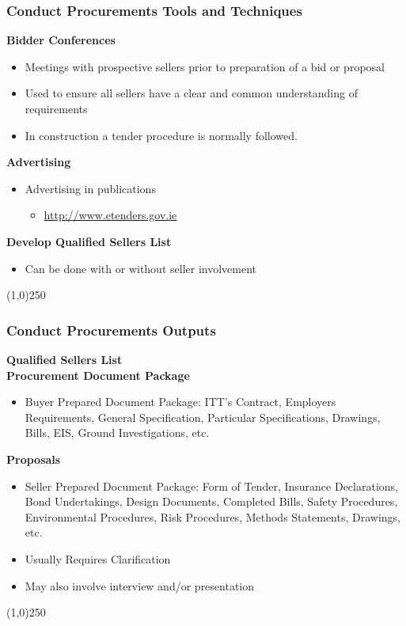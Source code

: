 \begin{frame}
\frametitle{Conduct Procurements \hfill\hfill Tools and Techniques}
\textbf{Bidder Conferences}
	\begin{itemize}
		\item Meetings with prospective sellers prior to preparation of a bid or proposal
		\item Used to ensure all sellers have a clear and common understanding of requirements
		\item In construction a tender procedure is normally followed.
	\end{itemize}
\textbf{Advertising}
\begin{itemize}
	\item Advertising in publications
		\begin{itemize}
			\item \href{http://www.etenders.gov.ie}{http://www.etenders.gov.ie}
		\end{itemize}
\end{itemize}
\textbf{Develop Qualified Sellers List}
\begin{itemize}
	\item Can be done with or without seller involvement
\end{itemize}
\end{frame}\begin{center}\line(1,0){250}\end{center}



\begin{frame}
\frametitle{Conduct Procurements \hfill\hfill Outputs}
\textbf{Qualified Sellers List}\\
\textbf{Procurement Document Package}
		\begin{itemize}
			\item Buyer Prepared Document Package: ITT's Contract, Employers Requirements, General Specification, Particular Specifications, Drawings, Bills, EIS, Ground Investigations, etc.
		\end{itemize}
\textbf{Proposals}
		\begin{itemize}
			\item Seller Prepared Document Package: Form of Tender, Insurance Declarations, Bond Undertakings, Design Documents, Completed Bills, Safety Procedures, Environmental Procedures, Risk Procedures, Methods Statements, Drawings, etc.
			\item Usually Requires Clarification
			\item May also involve interview and/or presentation
		\end{itemize}
\end{frame}\begin{center}\line(1,0){250}\end{center}



